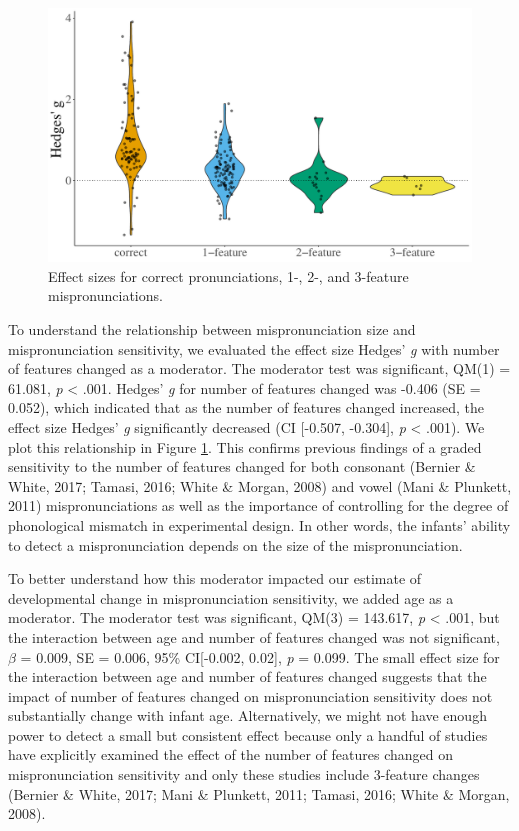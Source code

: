 \documentclass[man]{apa6}
\begin{document}
\begin{figure}
\centering
\includegraphics{VonHolzenBergmann_MPMetaAnalysis_files/figure-latex/PlotFeatEffect-1.pdf}
\caption{\label{fig:PlotFeatEffect}Effect sizes for correct pronunciations, 1-, 2-, and 3-feature mispronunciations.}
\end{figure}

To understand the relationship between mispronunciation size and mispronunciation sensitivity, we evaluated the effect size Hedges' \emph{g} with number of features changed as a moderator. The moderator test was significant, QM(1) = 61.081, \emph{p} \textless{} .001. Hedges' \emph{g} for number of features changed was -0.406 (SE = 0.052), which indicated that as the number of features changed increased, the effect size Hedges' \emph{g} significantly decreased (CI {[}-0.507, -0.304{]}, \emph{p} \textless{} .001). We plot this relationship in Figure \ref{fig:PlotFeatEffect}. This confirms previous findings of a graded sensitivity to the number of features changed for both consonant (Bernier \& White, 2017; Tamasi, 2016; White \& Morgan, 2008) and vowel (Mani \& Plunkett, 2011) mispronunciations as well as the importance of controlling for the degree of phonological mismatch in experimental design. In other words, the infants' ability to detect a mispronunciation depends on the size of the mispronunciation.

To better understand how this moderator impacted our estimate of developmental change in mispronunciation sensitivity, we added age as a moderator. The moderator test was significant, QM(3) = 143.617, \emph{p} \textless{} .001, but the interaction between age and number of features changed was not significant, \(\beta\) = 0.009, SE = 0.006, 95\% CI{[}-0.002, 0.02{]}, \emph{p} = 0.099. The small effect size for the interaction between age and number of features changed suggests that the impact of number of features changed on mispronunciation sensitivity does not substantially change with infant age. Alternatively, we might not have enough power to detect a small but consistent effect because only a handful of studies have explicitly examined the effect of the number of features changed on mispronunciation sensitivity and only these studies include 3-feature changes (Bernier \& White, 2017; Mani \& Plunkett, 2011; Tamasi, 2016; White \& Morgan, 2008).
\end{document}
